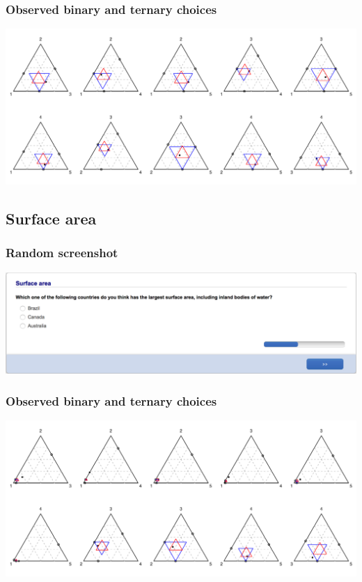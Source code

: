 \documentclass[11pt,letter]{article}
\begin{document}
\subsubsection*{Observed binary and ternary choices}

\includegraphics[width=15cm]{./Population_study_data/Simplexes/Population.pdf}

\pagebreak

\subsection{Surface area}



\subsubsection*{Random screenshot}

\includegraphics[width=15cm]{Population_study_design/screenshot_Surface_Area.png}

\subsubsection*{Observed binary and ternary choices}

\includegraphics[width=15cm]{./Population_study_data/Simplexes/Surface_area.pdf}
\end{document}
